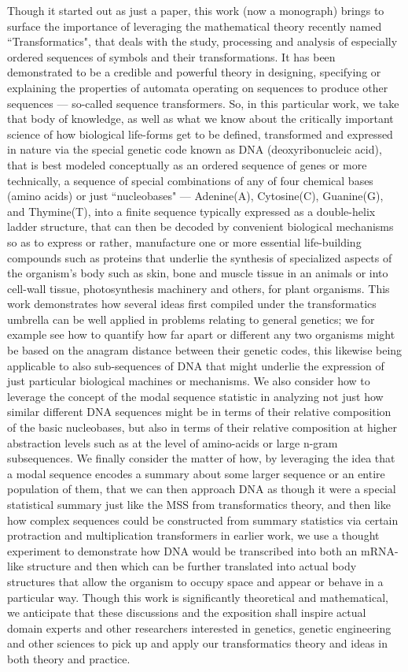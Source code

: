 \documentclass[a4paper, 18pt]{book} %
\begin{document}
Though it started out as just a paper, this work (now a monograph) brings to surface the importance of leveraging the mathematical theory recently named ``Transformatics"\cite{transformatics}, that deals with the study, processing and analysis of especially ordered sequences of symbols and their transformations. It has been demonstrated to be a credible and powerful theory in designing, specifying or explaining the properties of automata operating on sequences to produce other sequences --- so-called sequence transformers. So, in this particular work, we take that body of knowledge, as well as what we know about the critically important science of how biological life-forms get to be defined, transformed and expressed in nature via the special genetic code known as DNA (deoxyribonucleic acid), that is best modeled conceptually as an ordered sequence of genes or more technically, a sequence of special combinations of any of four chemical bases (amino acids) or just ``nucleobases" --- Adenine(A), Cytosine(C), Guanine(G), and Thymine(T), into a finite sequence typically expressed as a double-helix ladder structure, that can then be decoded by convenient biological mechanisms so as to express or rather, manufacture one or more essential life-building compounds such as proteins that underlie the synthesis of specialized aspects of the organism's body such as skin, bone and muscle tissue in an animals or into cell-wall tissue, photosynthesis machinery and others, for plant organisms. This work demonstrates how several ideas first compiled under the transformatics umbrella can be well applied in problems relating to general genetics; we for example see how to quantify how far apart or different any two organisms might be based on the anagram distance between their genetic codes, this likewise being applicable to also sub-sequences of DNA that might underlie the expression of  just particular biological machines or mechanisms. We also consider how to leverage the concept of the modal sequence statistic in analyzing not just how similar different DNA sequences might be in terms of their relative composition of the basic nucleobases, but also in terms of their relative composition at higher abstraction levels such as at the level of amino-acids or large n-gram subsequences. We finally consider the matter of how, by leveraging the idea that a modal sequence encodes a summary about some larger sequence or an entire population of them, that we can then approach DNA as though it were a special statistical summary just like the MSS from transformatics theory, and then like how complex sequences could be constructed from summary statistics via certain protraction and multiplication transformers in earlier work, we use a thought experiment to demonstrate how DNA would be transcribed into both an mRNA-like structure and then which can be further translated into actual body structures that allow the organism to occupy space and appear or behave in a particular way. Though this work is significantly theoretical and mathematical, we anticipate that these discussions and the exposition shall inspire actual domain experts and other researchers interested in genetics, genetic engineering and other sciences to pick up and apply our transformatics theory and ideas in both theory and practice.
\end{document}
